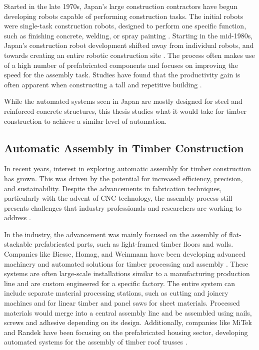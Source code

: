 Started in the late 1970s, Japan’s large construction contractors have begun developing robots capable of performing construction tasks. The initial robots were single-task construction robots, designed to perform one specific function, such as finishing concrete, welding, or spray painting \parencite{potterJapanSkyscraperFactories2022}. Starting in the mid-1980s, Japan’s construction robot development shifted away from individual robots, and towards creating an entire robotic construction site \parencite{maedaCurrentResearchDevelopment2005}. The process often makes use of a high number of prefabricated components and focuses on improving the speed for the assembly task. Studies have found that the productivity gain is often apparent when constructing a tall and repetitive building \parencite{linnerAutomatedRoboticConstruction2013,potterJapanSkyscraperFactories2022}. 

While the automated systems seen in Japan are mostly designed for steel and reinforced concrete structures, this thesis studies what it would take for timber construction to achieve a similar level of automation. 

\subsection{Automatic Assembly in Timber Construction}
\label{subsection:introduction-automatic-assembly-in-timber-construction}

In recent years, interest in exploring automatic assembly for timber construction has grown. This was driven by the potential for increased efficiency, precision, and sustainability. Despite the advancements in fabrication techniques, particularly with the advent of CNC technology, the assembly process still presents challenges that industry professionals and researchers are working to address \parencite{willmannNewParadigmsAutomatic2016}.

In the industry, the advancement was mainly focused on the assembly of flat-stackable prefabricated parts, such as light-framed timber floors and walls. Companies like Biesse, Homag, and Weinmann have been developing advanced machinery and automated solutions for timber processing and assembly \parencite{kooTechnologyGapsAchieve2021}. These systems are often large-scale installations similar to a manufacturing production line and are custom engineered for a specific factory. The entire system can include separate material processing stations, such as cutting and joinery machines and for linear timber and panel saws for sheet materials. Processed materials would merge into a central assembly line and be assembled using nails, screws and adhesive depending on its design. Additionally, companies like MiTek and Randek have been focusing on the prefabricated housing sector, developing automated systems for the assembly of timber roof trusses \parencite{ianharveyRoboticArmsAI2018}. 

